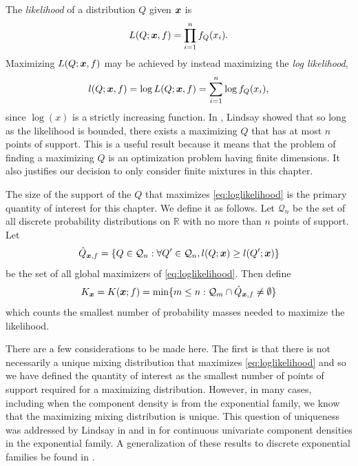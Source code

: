 	The \emph{likelihood} of a distribution $Q$ given ${\bm{{x}}}$ is 
	\begin{equation}
		L(Q;{\bm{{x}}}, f) = \prod_{i = 1}^n f_Q(x_i).
	\end{equation}
	Maximizing $L(Q;{\bm{{x}}}, f)$ may be achieved by instead maximizing the \emph{log likelihood},
	\begin{equation}
		l(Q; {\bm{{x}}}, f) = \log L(Q; {\bm{{x}}}, f) = \sum_{i = 1}^n \log f_Q(x_i),
		\label{eq:loglikelihood}
	\end{equation}
	since $\log(x)$ is a strictly increasing function. In \cite{Lindsay1983-tf}, Lindsay showed that so long as the likelihood is bounded, there exists a maximizing $Q$ that has at most $n$ points of support. This is a useful result because it means that the problem of finding a maximizing $Q$ is an optimization problem having finite dimensions. It also justifies our decision to only consider finite mixtures in this chapter.

	The size of the support of the $Q$ that maximizes \eqref{eq:loglikelihood} is the primary quantity of interest for this chapter. We define it as follows. Let $\mathcal{Q}_n$ be the set of all discrete probability distributions on $\mathbb{R}$ with no more than $n$ points of support. Let
	\begin{equation}
		\hat{Q}_{{\bm{{x}}},f} = \{Q \in \mathcal{Q}_n: \forall Q' \in \mathcal{Q}_n, l(Q;{\bm{{x}}}) \geq l(Q';{\bm{{x}}})\}
	\end{equation}
	be the set of all global maximizers of \eqref{eq:loglikelihood}. Then define
	\begin{equation}
		K_{\bm{{x}}} = K({\bm{{x}}}; f) = \min\{m \leq n : \mathcal{Q}_m \cap \hat{Q}_{{\bm{{x}}},f} \neq \emptyset\}
	\end{equation}
	which counts the smallest number of probability masses needed to maximize the likelihood.


	There are a few considerations to be made here. The first is that there is not necessarily a unique mixing distribution that maximizes \eqref{eq:loglikelihood} and so we have defined the quantity of interest as the smallest number of points of support required for a maximizing distribution. However, in many cases, including when the component density is from the exponential family, we know that the maximizing mixing distribution is unique. This question of uniqueness was addressed by Lindsay in \cite{Lindsay1983-tf} and in \cite{Lindsay1983a-he} for continuous univariate component densities in the exponential family. A generalization of these results to discrete exponential families be found in \cite{Lindsay1993-rj}.

